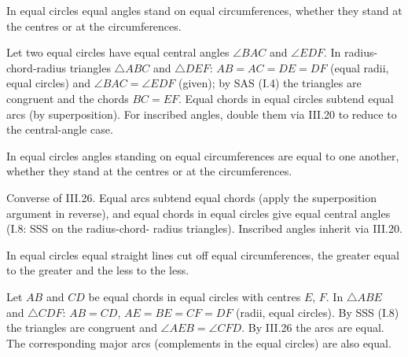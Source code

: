 \documentclass{rrxiv}
\begin{document}
\begin{claim}
\label{prop:III.26}
In equal circles equal angles stand on equal circumferences, whether
they stand at the centres or at the circumferences.
\end{claim}
\begin{evidence}
\label{ev:III.26}
Let two equal circles have equal central angles $\angle BAC$ and
$\angle EDF$.  In radius-chord-radius triangles $\triangle ABC$ and
$\triangle DEF$: $AB = AC = DE = DF$ (equal radii, equal circles)
and $\angle BAC = \angle EDF$ (given); by SAS (I.4) the triangles
are congruent and the chords $BC = EF$.  Equal chords in equal
circles subtend equal arcs (by superposition).  For inscribed
angles, double them via III.20 to reduce to the central-angle case.
\end{evidence}

\begin{claim}
\label{prop:III.27}
In equal circles angles standing on equal circumferences are equal to
one another, whether they stand at the centres or at the
circumferences.
\end{claim}
\begin{evidence}
\label{ev:III.27}
Converse of III.26.  Equal arcs subtend equal chords (apply the
superposition argument in reverse), and equal chords in equal
circles give equal central angles (I.8: SSS on the radius-chord-
radius triangles).  Inscribed angles inherit via III.20.
\end{evidence}

\begin{claim}
\label{prop:III.28}
In equal circles equal straight lines cut off equal circumferences,
the greater equal to the greater and the less to the less.
\end{claim}
\begin{evidence}
\label{ev:III.28}
Let $AB$ and $CD$ be equal chords in equal circles with centres $E$,
$F$.  In $\triangle ABE$ and $\triangle CDF$: $AB = CD$, $AE = BE
= CF = DF$ (radii, equal circles).  By SSS (I.8) the triangles are
congruent and $\angle AEB = \angle CFD$.  By III.26 the arcs are
equal.  The corresponding major arcs (complements in the equal
circles) are also equal.
\end{evidence}
\end{document}
